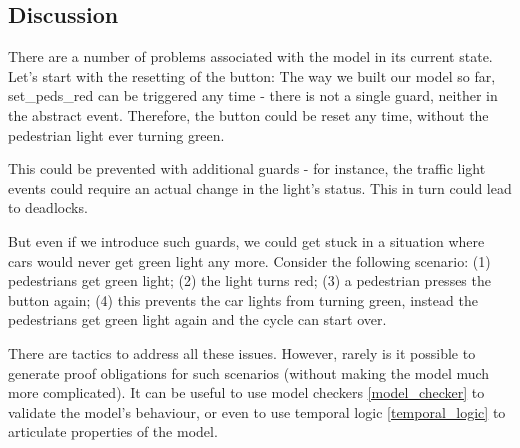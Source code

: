 \subsection{Discussion}

There are a number of problems associated with the model in its current state.  Let's start with the resetting of the button: The way we built our model so far, \textsf{set\_peds\_red} can be triggered any time - there is not a single guard, neither in the abstract event.  Therefore, the button could be reset any time, without the pedestrian light ever turning green.

This could be prevented with additional guards - for instance, the traffic light events could require an actual change in the light's status.  This in turn could lead to deadlocks.

But even if we introduce such guards, we could get stuck in a situation where cars would never get green light any more.  Consider the following scenario: (1) pedestrians get green light; (2) the light turns red; (3) a pedestrian presses the button again; (4) this prevents the car lights from turning green, instead the pedestrians get green light again and the cycle can start over.

There are tactics to address all these issues.  However, rarely is it possible to generate proof obligations for such scenarios (without making the model much more complicated).  It can be useful to use model checkers \ref{model_checker} to validate the model's behaviour, or even to use temporal logic \ref{temporal_logic} to articulate properties of the model.



